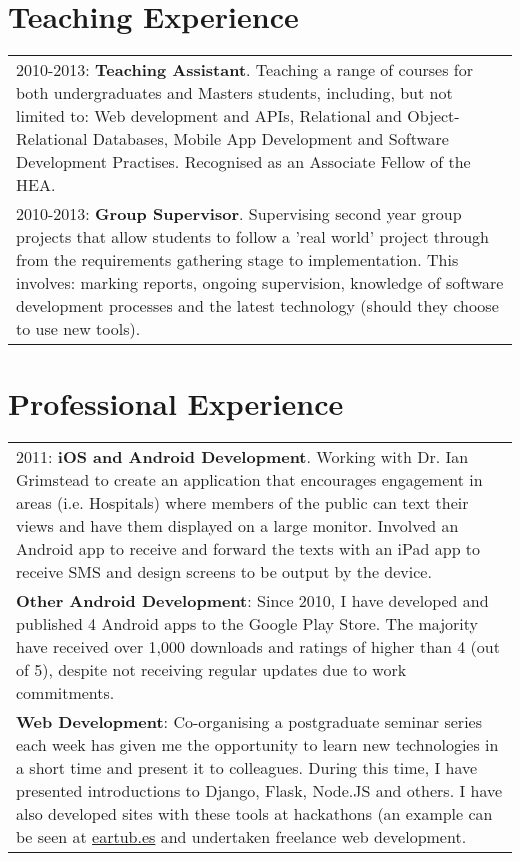 \documentclass[11pt,fullpage]{article}
\begin{document}
\section*{Teaching Experience}

\begin{tabular}{>{\everypar{\hangindent0.5in}}p{6in}}
	2010-2013: \textbf{Teaching Assistant}. Teaching a range of courses for both undergraduates and Masters students, including, but not limited to: Web development and APIs, Relational and Object-Relational Databases, Mobile App Development and Software Development Practises. Recognised as an Associate Fellow of the HEA.\\
	2010-2013: \textbf{Group Supervisor}. Supervising second year group projects that allow students to follow a 'real world' project through from the requirements gathering stage to implementation.  This involves: marking reports, ongoing supervision, knowledge of software development processes and the latest technology (should they choose to use new tools).\\
\end{tabular}

\section*{Professional Experience}

\begin{tabular}{>{\everypar{\hangindent0.5in}}p{6in}}
	2011: \textbf{iOS and Android Development}. Working with Dr. Ian Grimstead to create an application that encourages engagement in areas (i.e. Hospitals) where members of the public 		can text their views and have them displayed on a large monitor. Involved an Android app to receive and forward the texts with an iPad app to receive SMS and design screens to be 			output by the device. \\
	\textbf{Other Android Development}: Since 2010, I have developed and published 4 Android apps to the Google Play Store. The majority have received over 1,000 downloads and ratings of higher than 	4 (out of 5), despite not receiving regular updates due to work commitments. \\
	\textbf{Web Development}: Co-organising a postgraduate seminar series each week has given me the opportunity to learn new technologies in a short time and present it to colleagues. During this 	time, I have presented introductions to Django, Flask, Node.JS and others. I have also developed sites with these tools at hackathons (an example can be seen at 						    \href{http://eartub.es}{eartub.es} and undertaken freelance web development.
\end{tabular}
\end{document}
